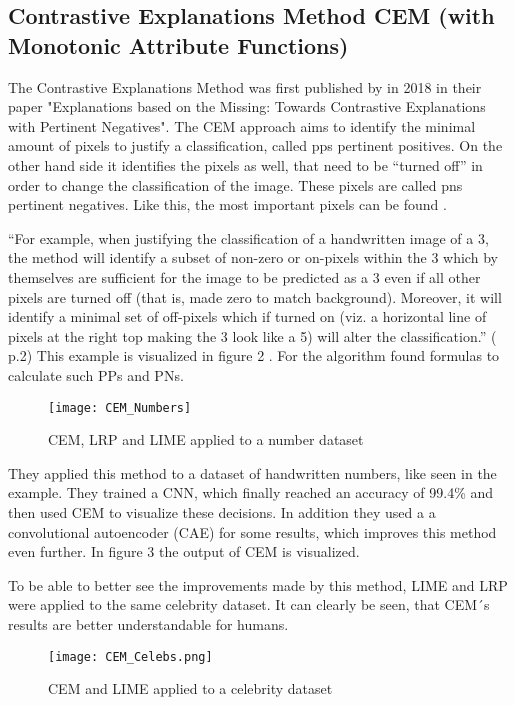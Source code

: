 \subsection{Contrastive Explanations Method CEM (with Monotonic Attribute Functions)}
The Contrastive Explanations Method was first published by  in 2018 in their paper "Explanations based on the Missing: Towards Contrastive Explanations with Pertinent Negatives".
The CEM approach aims to identify the minimal amount of pixels to justify a classification, called \glspl{pp} pertinent positives. On the other hand side it identifies the pixels as well, that need to be “turned off” in order to change the classification of the image. These pixels are called \glspl{pn} pertinent negatives. Like this, the most important pixels can be found . 
\par
“For example, when justifying the classification of a handwritten image of a 3, the method will identify a subset of non-zero or on-pixels within the 3 which by themselves are sufficient for the image to be predicted as a 3 even if all other pixels are turned off (that is, made zero to match background). Moreover, it will identify a minimal set of off-pixels which if turned on (viz. a horizontal line of pixels at the right top making the 3 look like a 5) will alter the classification.” ( p.2)
This example is visualized in figure 2 .
For the algorithm  found formulas to calculate such PPs and PNs.
\begin{figure*}
    \center
    \texttt{[image: CEM\_Numbers]}
    \caption{CEM, LRP and LIME applied to a number dataset}
\end{figure*}
They applied this method to a dataset of handwritten numbers, like seen in the example. They trained a CNN, which finally reached an accuracy of 99.4\% and then used CEM to visualize these decisions. In addition they used a a convolutional autoencoder (CAE) for some results, which improves this method even further. In figure 3 the output of CEM is visualized. 
\par
To be able to better see the improvements made by this method, LIME and LRP were applied to the same celebrity dataset. It can clearly be seen, that CEM´s results are better understandable for humans.
\begin{figure*}
    \center
    \texttt{[image: CEM\_Celebs.png]}
    \caption{CEM and LIME applied to a celebrity dataset}
\end{figure*}

